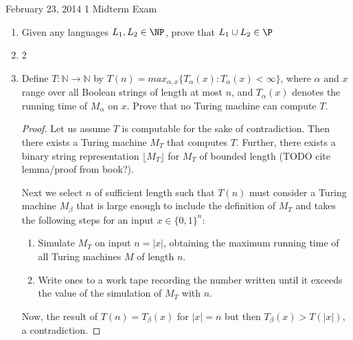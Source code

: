 \documentclass[usletter]{article}
\begin{document}
           {February 23, 2014}
           {1}
           {Midterm Exam}

\begin{enumerate}
  \item Given any languages $L_1, L_2 \in \NP$, prove that $L_1 \cup L_2 \in \P$
  \item 2
  \item Define $T : \mathbb{N} \rightarrow \mathbb{N}$ by $T(n) = max_{\alpha,x}\{T_{\alpha}(x) : T_{\alpha}(x) < \infty \}$, where $\alpha$ and $x$ range over all Boolean strings of length at most $n$, and $T_{\alpha}(x)$ denotes the running time of $M_{\alpha}$ on $x$. Prove that no Turing machine can compute $T$.

    \begin{proof}
      Let us assume $T$ is computable for the sake of contradiction. Then there exists a Turing machine $M_T$ that computes $T$. Further, there exists a binary string representation $\lfloor M_T \rfloor$ for $M_T$ of bounded length (TODO cite lemma/proof from book?).

      Next we select $n$ of sufficient length such that $T(n)$ must consider a Turing machine $M_{\beta}$ that is large enough to include the definition of $M_T$ and takes the following steps for an input $x \in \{0,1\}^n$:
      \begin{enumerate}
        \item Simulate $M_T$ on input $n = |x|$, obtaining the maximum running time of all Turing machines $M$ of length $n$.
        \item Write ones to a work tape recording the number written until it exceeds the value of the simulation of $M_T$ with $n$.
      \end{enumerate}

      Now, the result of $T(n) = T_{\beta}(x)$ for $|x| = n$ but then $T_{\beta}(x) > T(|x|)$, a contradiction.

    \end{proof}

\end{enumerate}
\end{document}
